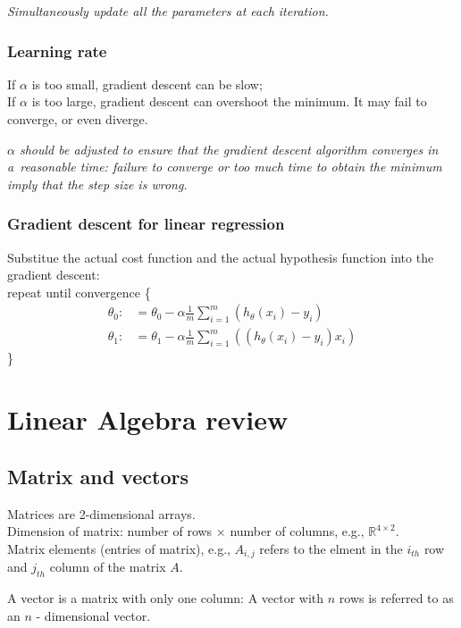 \emph{\textcolor{Bittersweet}{Simultaneously update all the parameters at each iteration.}}

\subsubsection{Learning rate}
If $\alpha$ is too small, gradient descent can be slow;\\
If $\alpha$ is too large, gradient descent can overshoot the minimum. It may fail to converge, or even diverge.

\emph{\textcolor{Bittersweet}{$\alpha$ should be adjusted to ensure that the gradient descent algorithm converges in a reasonable time: failure to converge or too much time to obtain the minimum imply that the step size is wrong.}}

\subsubsection{Gradient descent for linear regression}
Substitue the actual cost function and the actual hypothesis function into the gradient descent:\\
repeat until convergence \{ \\
\begin{align*} 
\theta_0: &= \theta_0 - \alpha \frac{1}{m} \sum_{i=1}^m (h_\theta(x_i)-y_i) \\
\theta_1: &= \theta_1 - \alpha \frac{1}{m} \sum_{i=1}^m ((h_\theta(x_i)-y_i)x_i)
\end{align*}
\}

\section{Linear Algebra review}
\label{sec:Linear Algebra review}
%
\subsection{Matrix and vectors}
Matrices are 2-dimensional arrays. \\
Dimension of matrix: number of rows $\times$ number of columns, e.g.,  $\mathbb{R}^{4\times2}$. \\
Matrix elements (entries of matrix), e.g., $A_{i,j}$ refers to the elment in the $i_{th}$ row and $j_{th}$ column of the matrix $\mathit{A}$.

A vector is a matrix with only one column: A vector with $\mathit{n}$ rows is referred to as an $\mathit{n}$ - dimensional vector.

